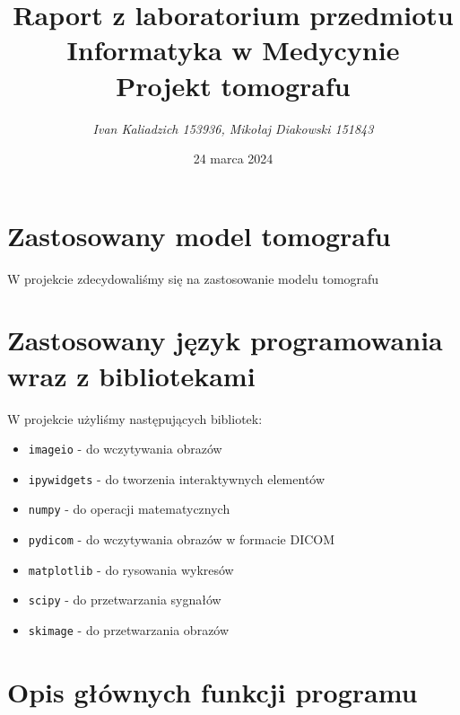 \documentclass[11pt,a4paper]{article}
\title{Raport z laboratorium przedmiotu\\Informatyka w Medycynie\\Projekt tomografu}
\author{\emph{Ivan Kaliadzich 153936, Mikołaj Diakowski 151843}}
\date{24 marca 2024}
\begin{document}
\maketitle
    \section{Zastosowany model tomografu}
    W projekcie zdecydowaliśmy się na zastosowanie modelu tomografu
    \section{Zastosowany język programowania wraz z bibliotekami}
    W projekcie użyliśmy następujących bibliotek:
    \begin{itemize}
        \item \texttt{imageio} - do wczytywania obrazów
        \item \texttt{ipywidgets} - do tworzenia interaktywnych elementów
        \item \texttt{numpy} - do operacji matematycznych
        \item \texttt{pydicom} - do wczytywania obrazów w formacie DICOM
        \item \texttt{matplotlib} - do rysowania wykresów
        \item \texttt{scipy} - do przetwarzania sygnałów
        \item \texttt{skimage} - do przetwarzania obrazów
        \end{itemize}
    \section{Opis głównych funkcji programu}
\end{document}
